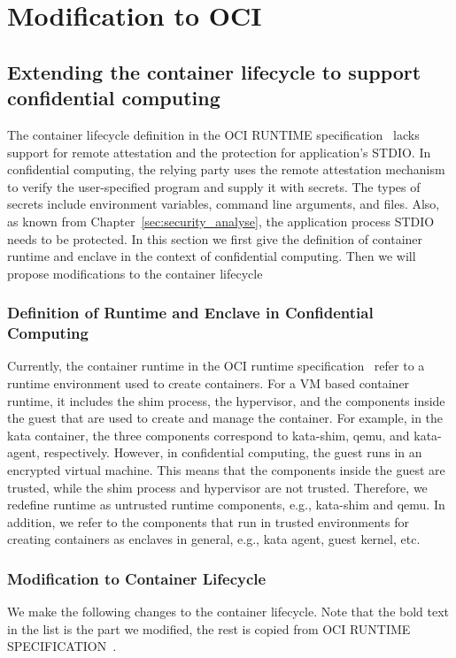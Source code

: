 \section{Modification to OCI}
\label{sec:Modification_OCI}

\subsection{Extending the container lifecycle to support confidential computing}
The container lifecycle definition in the OCI RUNTIME specification~\cite*{oci-runtime-spec} lacks support for remote attestation and the protection for application’s STDIO. In confidential computing, the relying party uses the remote 
attestation mechanism to verify the user-specified program and supply it with secrets. The types of secrets include environment variables, command line arguments, and files. Also, as known from Chapter~\ref*{sec:security_analyse}, the application 
process STDIO needs to be protected. In this section we first give the definition of container runtime and enclave in the context of confidential computing. Then we will propose modifications to the container lifecycle


\subsubsection{Definition of Runtime and Enclave in Confidential Computing}

Currently, the container runtime in the OCI runtime specification~\cite*{oci-runtime-spec} refer to a runtime environment used to create containers. For a VM based container runtime, it includes the shim process, the hypervisor, and the components 
inside the guest that are used to create and manage the container. For example, in the kata container, the three components correspond to kata-shim, qemu, and kata-agent, respectively. However, in confidential computing, the guest runs in an 
encrypted virtual machine. This means that the components inside the guest are trusted, while the shim process and hypervisor are not trusted. Therefore, we redefine runtime as untrusted runtime components, e.g., kata-shim and qemu. 
In addition, we refer to the components that run in trusted environments for creating containers as enclaves in general, e.g., kata agent, guest kernel, etc.

\subsubsection{Modification to Container Lifecycle}
We make the following changes to the container lifecycle. Note that the bold text in the list is the part we modified, the rest is copied from OCI RUNTIME SPECIFICATION~\cite*{oci-runtime-spec}.

